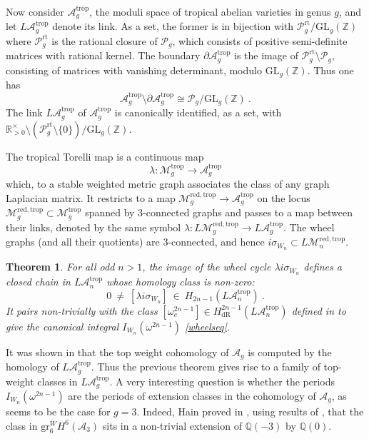 \documentclass[10pt]{amsart}
\newcommand{\QQ}{{\mathbb Q}}
\newcommand{\RR}{{\mathbb R}}
\newcommand{\ZZ}{{\mathbb Z}}
\theoremstyle{plain}
\newtheorem{thm}{Theorem}
\newcommand{\LM}{L\mathcal{M}}
\newcommand{\LA}{L\mathcal{A}}
\newcommand{\GL}{\mathrm{GL}}
\newcommand{\trop}{\mathrm{trop}}
\newcommand{\To}{\longrightarrow}
\newcommand{\0}{\color{blue}{\mathsf{0}}}
\begin{document}
Now consider  $\mathcal{A}^{\trop}_g$,  the moduli space of tropical abelian varieties in genus $g$, and let $\LA_g^{\trop}$ denote its link. As a set, the former  is in bijection with $\mathcal{P}^{\mathrm{rt}}_g/\GL_g(\ZZ)$ where $\mathcal{P}^{\mathrm{rt}}_g$ is the rational closure of $\mathcal{P}_g$, which consists of positive semi-definite matrices with rational kernel.  The boundary $\partial \mathcal{A}^{\trop}_g$ is the image of $\mathcal{P}_g^{\mathrm{rt}}\setminus \mathcal{P}_g$, consisting of matrices with vanishing determinant, modulo $\GL_g(\ZZ)$. 
Thus one has
\[ \mathcal{A}_g^{\trop} \setminus \partial \mathcal{A}_g^{\trop}   \cong   \mathcal{P}_g / \GL_g(\ZZ)\ . \]
The link $\LA_g^{\trop}$ of $\mathcal{A}_g^{\trop}$ is canonically identified,   as a set, with $\RR_{>0}^{\times} \setminus \left(\mathcal{P}^{\mathrm{rt}}_g \setminus \{0\}\right)/\GL_g(\ZZ)$. 

The tropical Torelli map   \cite{Nagnibeda, Baker, CaporasoViviani, MikhalinZharkov, BMV} 
 is a continuous map
\begin{equation} \label{intro: TropTorelli}  \lambda:  \mathcal{M}_g^{\trop} \To \mathcal{A}_g^{\trop} \end{equation}
which, to a stable weighted metric graph associates the class of any  graph Laplacian matrix. 
It restricts to a map  $\mathcal{M}_g^{\mathrm{red},\trop} \rightarrow \mathcal{A}_g^{\trop}$ on the locus $\mathcal{M}_g^{\mathrm{red},\trop}  \subset  \mathcal{M}_g^{\trop}$ spanned by 3-connected graphs and passes to a map between 
their links, denoted  by   the same symbol $\lambda: \LM_g^{\mathrm{red}, \trop} \rightarrow \LA_g^{\trop}$. The wheel graphs (and all their quotients) are 3-connected, and hence $i\sigma_{W_n} \subset \LM_n^{\mathrm{red}, \trop}$.



\begin{thm} \label{thm: introLAgclass} For all odd $n>1$, the image of the  wheel cycle $\lambda i\sigma_{W_n}$ defines a  closed chain  in $\LA_n^{\trop}$ whose homology class is  non-zero:
\[   0  \ \neq \  [   \lambda  i  \sigma_{W_n}  ]  \  \in \  H_{2n-1} \left(   \LA_n^{\trop}\right)  \ .   \]
   It pairs non-trivially with the class  $[\omega_c^{2n-1} ] \in H_ {\mathrm{dR}}^{2n-1} \left(\LA_n^{\trop} \right) $ defined in \cite{brown2023bordifications} to give the canonical  integral $I_{W_n}(\omega^{2n-1})$  \eqref{wheelseq}. 
\end{thm}



It was shown in \cite{TopWeightAg, OdakaOshima} that the top weight cohomology of $\mathcal{A}_g$ 
is computed by the homology of $\LA_g^{\trop}.$ Thus the previous theorem gives rise to a family of top-weight classes in $\LA_g^{\trop}$. A very interesting question is whether the periods $I_{W_n}(\omega^{2n-1})$   are the periods of extension classes in the cohomology of $\mathcal{A}_g$, as seems to be the case for $g=3$. Indeed, Hain proved  in \cite{Hain3folds}, using results of \cite{Looijenga}, that the class in $\mathrm{gr}^W_6 H^6 (\mathcal{A}_3)$ sits in  a non-trivial extension  of $\QQ(-3)$ by $\QQ(0)$.
\end{document}
